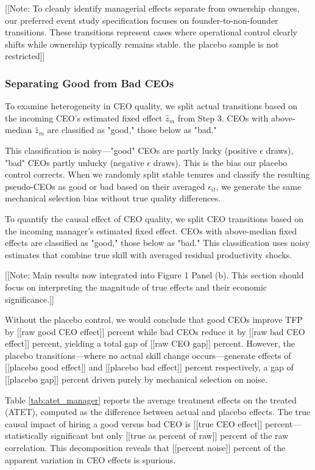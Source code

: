 \documentclass[11pt,a4paper]{article}
\begin{document}
[[Note: To cleanly identify managerial effects separate from ownership changes, our preferred event study specification focuses on founder-to-non-founder transitions. These transitions represent cases where operational control clearly shifts while ownership typically remains stable. the placebo sample is not restricted]]

\subsubsection{Separating Good from Bad CEOs}

To examine heterogeneity in CEO quality, we split actual transitions based on the incoming CEO's estimated fixed effect $\hat{z}_m$ from Step 3. CEOs with above-median $\hat{z}_m$ are classified as "good," those below as "bad."

This classification is noisy—"good" CEOs are partly lucky (positive $\epsilon$ draws), "bad" CEOs partly unlucky (negative $\epsilon$ draws). This is the bias our placebo control corrects. When we randomly split stable tenures and classify the resulting pseudo-CEOs as good or bad based on their averaged $\epsilon_{it}$, we generate the same mechanical selection bias without true quality differences.



To quantify the causal effect of CEO quality, we split CEO transitions based on the incoming manager's estimated fixed effect. CEOs with above-median fixed effects are classified as "good," those below as "bad." This classification uses noisy estimates that combine true skill with averaged residual productivity shocks.

[[Note: Main results now integrated into Figure 1 Panel (b). This section should focus on interpreting the magnitude of true effects and their economic significance.]]

Without the placebo control, we would conclude that good CEOs improve TFP by [[raw good CEO effect]] percent while bad CEOs reduce it by [[raw bad CEO effect]] percent, yielding a total gap of [[raw CEO gap]] percent. However, the placebo transitions—where no actual skill change occurs—generate effects of [[placebo good effect]] and [[placebo bad effect]] percent respectively, a gap of [[placebo gap]] percent driven purely by mechanical selection on noise.

Table \ref{tab:atet_manager} reports the average treatment effects on the treated (ATET), computed as the difference between actual and placebo effects. The true causal impact of hiring a good versus bad CEO is [[true CEO effect]] percent—statistically significant but only [[true as percent of raw]] percent of the raw correlation. This decomposition reveals that [[percent noise]] percent of the apparent variation in CEO effects is spurious.
\end{document}
